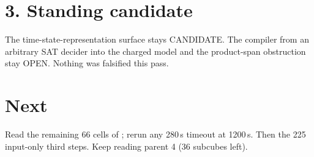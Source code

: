 \documentclass[11pt]{article}
\begin{document}
\section*{3. Standing candidate}
The time-state-representation surface stays CANDIDATE. The compiler from an arbitrary SAT decider into the charged model and the product-span obstruction stay OPEN. Nothing was falsified this pass.

\section*{Next}
Read the remaining 66 cells of ; rerun any 280\,s timeout at 1200\,s. Then the 225 input-only third steps. Keep reading parent 4 (36 subcubes left).
\end{document}
